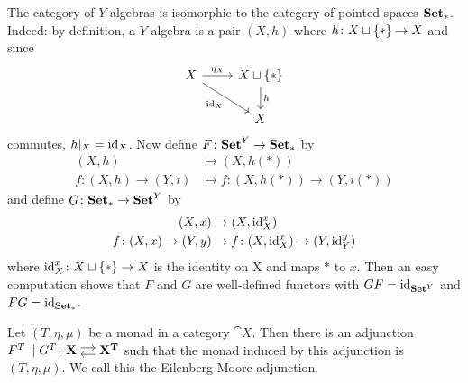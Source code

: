 \begin{example}
    The category of $Y$-algebras is isomorphic to the category of pointed spaces $\mathbf{Set_{\ast}}$.
    Indeed: by definition, a $Y$-algebra is a pair $(X,h)$ where $h \colon X \sqcup \{\ast\} \to X$
    and since 
    \[
     \begin{tikzcd}
         X \ar[r,"\eta_X"] \ar[rd,"\id_X"']
         & X \sqcup \pt \ar[d,"h"] \\
         & X 
     \end{tikzcd}
    \]
    commutes, $h\arrowvert_X = \operatorname{id}_X$. Now define $F \colon \mathbf{Set}^Y \to \mathbf{Set_{\ast}}$ by 
    \begin{align*}
        (X,h) &\mapsto (X,h(\ast)) \\
        f \colon (X,h) \to (Y,i) &\mapsto f \colon (X,h(\ast)) \to (Y,i(\ast))
    \end{align*}
    and define $G \colon \mathbf{Set_{\ast}} \to \mathbf{Set}^Y$ by 
    \begin{align*}
        (X,x) &\mapsto (X, \operatorname{id}_{X}^x) \\
        f \colon (X,x) \to (Y,y) &\mapsto f \colon (X,\operatorname{id}_{X}^x) \to (Y,\operatorname{id}_Y^y)
    \end{align*}
    where $\operatorname{id}_X^x \colon X \sqcup \{\ast\} \to X$ is the identity on X and maps $\ast$ to $x$.
    Then an easy computation shows that $F$ and $G$ are well-defined functors with
    $GF=\operatorname{id}_{\mathbf{Set}^Y}$ and $FG=\operatorname{id}_{\mathbf{Set_{\ast}}}$.
\end{example}
\begin{theorem}
    Let $(T,\eta,\mu)$ be a monad in a category $\cat{X}$.
    Then there is an adjunction $F^T \! \! \adj G^T \colon \adjar{X}{X^T}$
    such that the monad induced by this adjunction is $(T,\eta,\mu)$. We call this
    the Eilenberg-Moore-adjunction.
\end{theorem}
